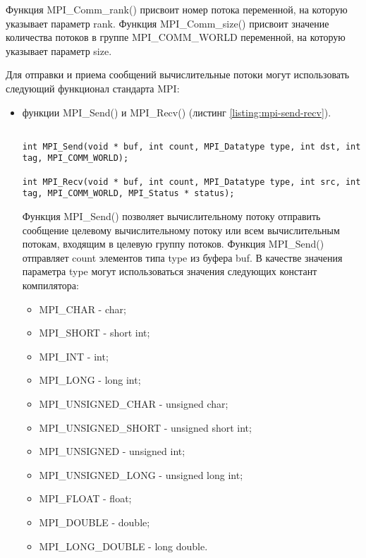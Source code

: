 Функция MPI\_Comm\_rank() присвоит номер потока переменной, на которую указывает параметр rank. Функция MPI\_Comm\_\linebreak size() присвоит значение количества потоков в группе MPI\_COMM\_\linebreak WORLD переменной, на которую указывает параметр size.

Для отправки и приема сообщений вычислительные потоки могут использовать следующий функционал стандарта MPI:

\begin{itemize}

	\item функции MPI\_Send() и MPI\_Recv() (листинг \ref{listing:mpi-send-recv}).

\begin{lstlisting}

int MPI_Send(void * buf, int count, MPI_Datatype type, int dst, int tag, MPI_COMM_WORLD);

int MPI_Recv(void * buf, int count, MPI_Datatype type, int src, int tag, MPI_COMM_WORLD, MPI_Status * status);

\end{lstlisting}
\mylistingend

	Функция MPI\_Send() позволяет вычислительному потоку отправить сообщение целевому вычислительному потоку или всем вычислительным потокам, входящим в целевую группу потоков. Функция MPI\_Send() отправляет count элементов типа type из буфера buf. В качестве значения параметра type могут использоваться значения следующих констант компилятора:

	\begin{itemize}

		\item MPI\_CHAR - char;
		\item MPI\_SHORT - short int;
		\item MPI\_INT - int;
		\item MPI\_LONG - long int;
		\item MPI\_UNSIGNED\_CHAR - unsigned char;
		\item MPI\_UNSIGNED\_SHORT - unsigned short int;
		\item MPI\_UNSIGNED - unsigned int;
		\item MPI\_UNSIGNED\_LONG - unsigned long int;
		\item MPI\_FLOAT - float;
		\item MPI\_DOUBLE - double;
		\item MPI\_LONG\_DOUBLE - long double.


\end{itemize}
\end{itemize}
